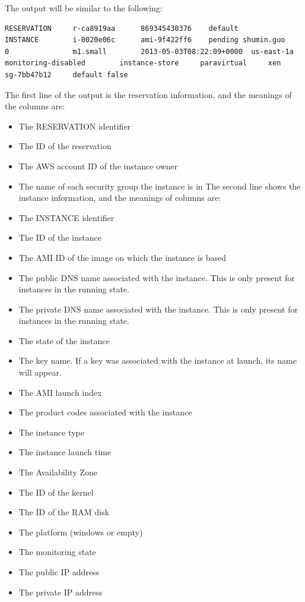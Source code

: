 The output will be similar to the following: 
\lstset{style=bashstyle}
\begin{lstlisting}
RESERVATION     r-ca8919aa      869345430376    default
INSTANCE        i-0020e06c      ami-9f422ff6    pending shumin.guo      0               m1.small        2013-05-03T08:22:09+0000  us-east-1a                              monitoring-disabled        instance-store     paravirtual     xen             sg-7bb47b12     default false
\end{lstlisting}
The first line of the output is the reservation information, and the meanings of the columns are:
\begin{itemize}
  \item The RESERVATION identifier
  \item The ID of the reservation
  \item The AWS account ID of the instance owner
  \item The name of each security group the instance is in
The second line shows the instance information, and the meanings of columns are:
  \item The INSTANCE identifier
  \item The ID of the instance
  \item The AMI ID of the image on which the instance is based
  \item The public DNS name associated with the instance. This is only present for instances in the running state.
  \item The private DNS name associated with the instance. This is only present for instances in the running state.
  \item The state of the instance
  \item The key name. If a key was associated with the instance at launch, its name will appear.
  \item The AMI launch index
  \item The product codes associated with the instance
  \item The instance type
  \item The instance launch time
  \item The Availability Zone
  \item The ID of the kernel
  \item The ID of the RAM disk
  \item The platform (windows or empty)
  \item The monitoring state
  \item The public IP address
  \item The private IP address

\end{itemize}
